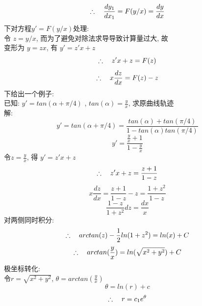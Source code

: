 {\Large \[ \therefore \hspace*{1em} \frac{dy_1}{dx_1} = F(y/x) = \frac{dy}{dx}  \] }
下对方程$y' = F(y/x) $处理:\\
令 $z = y/x $, 而为了避免对除法求导导致计算量过大, 
故\\
变形为 $y = z x$, 有 $y' = z' x + z $
\[ \therefore \hspace*{1em} z' x + z = F(z)  \]
\[ \therefore \hspace*{1em} x \frac{dz}{dx} = F(z) - z \]
下给出一个例子:\\
已知: $y' = tan(\alpha + \pi /4)$ , $tan(\alpha) = \frac{y}{x}$, 求原曲线轨迹\\
解:
\[ y' = tan(\alpha + \pi /4 ) = \frac{tan(\alpha) + tan(\pi /4)}{1 - tan(\alpha) tan(\pi /4)} \]
\[ y' = \frac{\frac{y}{x} + 1}{1 - \frac{y}{x} }  \]
令$z = \frac{y}{x} $, 得 $y' = z' x + z$
\[ \therefore \hspace*{1em} z' x + z = \frac{z + 1}{1 - z}  \]
\[ x \frac{dz}{dx} = \frac{z + 1}{1 - z} - z = \frac{1 + z^2}{1-z}\]
\[ \frac{1 - z}{1 + z^2} dz = \frac{dx}{x} \]
对两侧同时积分:
\[ \therefore \hspace*{1em} arctan(z) - \frac{1}{2} ln(1 + z^2) = ln(x) + C  \]
\[ \therefore \hspace*{1em} arctan(\frac{y}{x}) = ln(\sqrt{x^2 + y^2} ) + C  \]
极坐标转化:\\
令$r = \sqrt{x^2 + y^2} $, $ \theta = arctan(\frac{y}{x}) $
\[ \theta = ln(r) + c\]
\[ \therefore \hspace*{1em} r = c_1 e^{\theta}  \]
